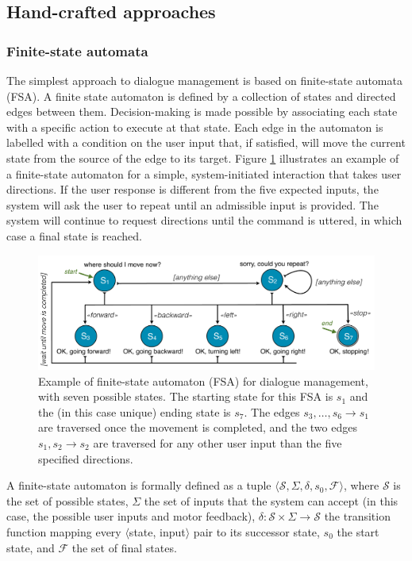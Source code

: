 \subsection{Hand-crafted approaches}
\label{sec:hand-crafted}

\subsubsection*{Finite-state automata}

The simplest approach to dialogue management is based on finite-state automata (FSA).  A finite state automaton is defined by a collection of states and directed edges between them.  Decision-making is made possible by associating each state with a specific action to execute at that state. Each edge in the automaton is labelled with a condition on the user input that, if satisfied, will move the current state from the source of the edge to its target.  Figure \ref{fig:fsa} illustrates an example of a finite-state automaton for a simple, system-initiated interaction that takes user directions.  If the user response is different from the five expected inputs, the system will ask the user to repeat until an admissible input is provided.  The system will continue to request directions until the  command is uttered, in which case a final state is reached. 


\begin{figure}[ht]
\centering
\includegraphics[scale=0.35]{imgs/fsa.pdf}
\caption{Example of finite-state automaton (FSA) for dialogue management, with seven possible states. The starting state for this FSA is $s_1$ and the (in this case unique) ending state is $s_7$. The edges $s_3,\dots, s_6 \rightarrow s_1$ are traversed once the movement is completed, and the two edges $s_1, s_2 \rightarrow s_2$ are traversed for any other user input than the five specified directions.}
\label{fig:fsa}
\end{figure}

A finite-state automaton is formally defined as a tuple $\langle \mathcal{S}, \Sigma, \delta, s_0, \mathcal{F} \rangle$, where $\mathcal{S}$ is the set of possible states, $\Sigma$ the set of inputs that the system can accept (in this case, the possible user inputs and motor feedback),  $\delta: \mathcal{S} \times \Sigma \rightarrow \mathcal{S}$ the transition function mapping every $\langle$state, input$\rangle$ pair to its successor state, $s_0$ the start state, and $\mathcal{F}$ the set of final states. 

